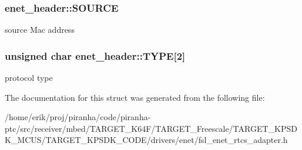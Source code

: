 \subsubsection[{\texorpdfstring{S\+O\+U\+R\+CE}{SOURCE}}]{ enet\+\_\+header\+::\+S\+O\+U\+R\+CE}\hypertarget{structenet__header_a1ef78dcecb9c3865713859ddb4359bce}{}\label{structenet__header_a1ef78dcecb9c3865713859ddb4359bce}
source Mac address 
\subsubsection[{\texorpdfstring{T\+Y\+PE}{TYPE}}]{\setlength{\rightskip}{0pt plus 5cm}unsigned char enet\+\_\+header\+::\+T\+Y\+PE\mbox{[}2\mbox{]}}\hypertarget{structenet__header_aa83b6f6dc0c894bb88267e6a835c31eb}{}\label{structenet__header_aa83b6f6dc0c894bb88267e6a835c31eb}
protocol type 

The documentation for this struct was generated from the following file\+:\begin{DoxyCompactItemize}
\item 
/home/erik/proj/piranha/code/piranha-\/ptc/src/receiver/mbed/\+T\+A\+R\+G\+E\+T\+\_\+\+K64\+F/\+T\+A\+R\+G\+E\+T\+\_\+\+Freescale/\+T\+A\+R\+G\+E\+T\+\_\+\+K\+P\+S\+D\+K\+\_\+\+M\+C\+U\+S/\+T\+A\+R\+G\+E\+T\+\_\+\+K\+P\+S\+D\+K\+\_\+\+C\+O\+D\+E/drivers/enet/fsl\+\_\+enet\+\_\+rtcs\+\_\+adapter.\+h\end{DoxyCompactItemize}
